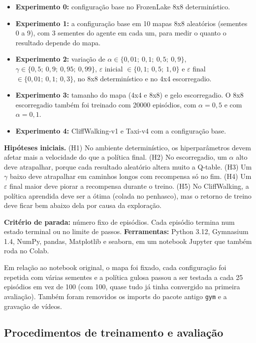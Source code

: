 \documentclass[11pt,a4paper]{article}
\begin{document}
\begin{itemize}
  \item \textbf{Experimento 0:} configuração base no FrozenLake 8x8 determinístico.
  \item \textbf{Experimento 1:} a configuração base em 10 mapas 8x8 aleatórios (sementes 0 a 9), com 3 sementes do
    agente em cada um, para medir o quanto o resultado depende do mapa.
  \item \textbf{Experimento 2:} variação de $\alpha \in \{0{,}01;\ 0{,}1;\ 0{,}5;\ 0{,}9\}$,
    $\gamma \in \{0{,}5;\ 0{,}9;\ 0{,}95;\ 0{,}99\}$, $\varepsilon$ inicial $\in \{0{,}1;\ 0{,}5;\ 1{,}0\}$ e
    $\varepsilon$ final $\in \{0{,}01;\ 0{,}1;\ 0{,}3\}$, no 8x8 determinístico e no 4x4 escorregadio.
  \item \textbf{Experimento 3:} tamanho do mapa (4x4 e 8x8) e gelo escorregadio. O 8x8 escorregadio também foi
    treinado com 20000 episódios, com $\alpha = 0{,}5$ e com $\alpha = 0{,}1$.
  \item \textbf{Experimento 4:} CliffWalking-v1 e Taxi-v4 com a configuração base.
\end{itemize}

\textbf{Hipóteses iniciais.}
(H1) No ambiente determinístico, os hiperparâmetros devem afetar mais a velocidade do que a política final.
(H2) No escorregadio, um $\alpha$ alto deve atrapalhar, porque cada resultado aleatório altera muito a Q-table.
(H3) Um $\gamma$ baixo deve atrapalhar em caminhos longos com recompensa só no fim.
(H4) Um $\varepsilon$ final maior deve piorar a recompensa durante o treino.
(H5) No CliffWalking, a política aprendida deve ser a ótima (colada no penhasco), mas o retorno de treino deve
ficar bem abaixo dela por causa da exploração.

\textbf{Critério de parada:} número fixo de episódios. Cada episódio termina num estado terminal ou no limite de
passos. \textbf{Ferramentas:} Python 3.12, Gymnasium 1.4, NumPy, pandas, Matplotlib e seaborn, em um notebook Jupyter
que também roda no Colab.

Em relação ao notebook original, o mapa foi fixado, cada configuração foi repetida com várias sementes e a política
gulosa passou a ser testada a cada 25 episódios em vez de 100 (com 100, quase tudo já tinha convergido na primeira
avaliação). Também foram removidos os imports do pacote antigo \texttt{gym} e a gravação de vídeos.

\subsection{Procedimentos de treinamento e avaliação}
\end{document}

